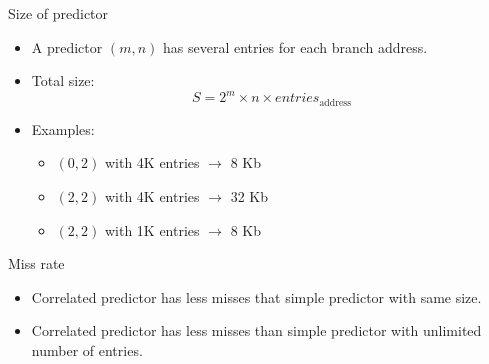 \begin{frame}[t]{Size of predictor}
\begin{itemize}
  \item A predictor $(m,n)$ has several entries for each branch address.

  \item Total size:
\[
S = 2^m \times n \times entries_{\text{address}}
\]

  \item Examples:
    \begin{itemize}
      \item $(0,2)$ with 4K entries $\rightarrow$ 8 Kb
      \item $(2,2)$ with 4K entries $\rightarrow$ 32 Kb
      \item $(2,2)$ with 1K entries $\rightarrow$ 8 Kb
   \end{itemize}
\end{itemize}
\end{frame}

\begin{frame}[t]{Miss rate}
\begin{itemize}
  \item Correlated predictor has less misses that simple predictor with same size.
  \item Correlated predictor has less misses than simple predictor with unlimited number of entries.
\end{itemize}

\end{frame}


